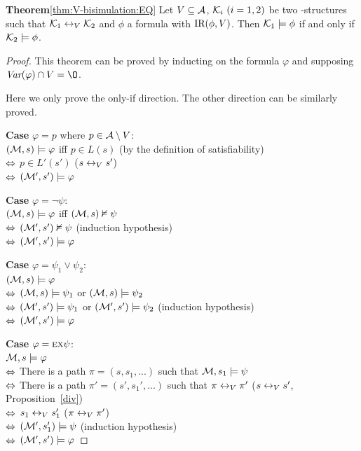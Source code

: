 \documentclass{article}
\begin{document}
\textbf{Theorem}\ref{thm:V-bisimulation:EQ}
Let $V\subseteq\cal A$, ${\cal K}_i~(i=1,2)$ be two \MPK-structures such that
  ${\cal K}_1\leftrightarrow_V{\cal K}_2$ and $\phi$ a formula with $\textrm{IR}(\phi,V)$. Then
  ${\cal K}_1\models\phi$ if and only if ${\cal K}_2\models\phi$.\\
\begin{proof}
This theorem can be proved by inducting on the formula $\varphi$ and supposing $\Var(\varphi) \cap V = \O$.

Here we only prove the only-if direction. The other direction can be similarly proved.

\textbf{Case} $\varphi = p$ where $p \in {\cal A} \setminus V$:\\
$({\cal M}, s) \models \varphi$ iff $p\in L(s)$  \hfill  (by the definition of satisfiability) \\
$\Leftrightarrow$ $p \in L'(s')$ \hfill ($s \leftrightarrow_V s'$)\\
$\Leftrightarrow$ $({\cal M}', s') \models \varphi$

\textbf{Case} $\varphi = \neg \psi$:\\
$({\cal M}, s) \models \varphi$ iff $({\cal M}, s) \nvDash \psi$ \\
$\Leftrightarrow$ $({\cal M}', s') \nvDash \psi$  \hfill   (induction hypothesis)\\
$\Leftrightarrow$ $({\cal M}', s') \models \varphi$

\textbf{Case} $\varphi = \psi_1 \vee \psi_2$:\\
$({\cal M}, s) \models \varphi$\\
$\Leftrightarrow$ $({\cal M}, s) \models \psi_1$ or $({\cal M}, s) \models \psi_2$\\
$\Leftrightarrow$ $({\cal M}', s') \models \psi_1$ or $({\cal M}', s') \models \psi_2$   \hfill  (induction hypothesis)\\
$\Leftrightarrow$ $({\cal M}', s') \models \varphi$

\textbf{Case} $\varphi = \textsc{e} \textsc{x} \psi$:\\
${\cal M}, s \models \varphi$ \\
$\Leftrightarrow$ There is a path $\pi = (s, s_1, ...)$ such that ${\cal M}, s_1 \models \psi$\\
$\Leftrightarrow$ There is a path $\pi' = (s', s_1', ...)$ such that $\pi \leftrightarrow_V \pi'$ \hfill   ($s \leftrightarrow_V s'$, Proposition~\ref{div})\\
$\Leftrightarrow$ $s_1 \leftrightarrow_V s_1'$  \hfill ($\pi \leftrightarrow_V \pi'$)\\
$\Leftrightarrow$ $({\cal M}', s_1') \models \psi$  \hfill  (induction hypothesis)\\
$\Leftrightarrow$ $({\cal M}', s') \models \varphi$


\end{proof}
\end{document}
